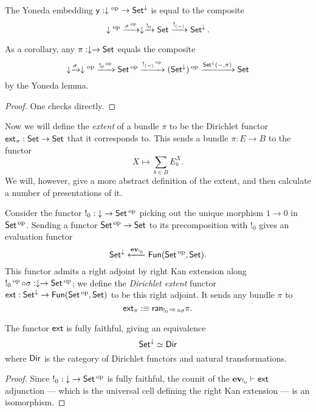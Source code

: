 \begin{lem}
The Yoneda embedding $\yo : \downarrow\op \to \Set^{\downarrow}$ is equal to the
composite $$\downarrow\op \xto{\sigma\op} \downarrow \xto{!_{0}} \Set
\xto{!_{(-)}} \Set^{\downarrow}.$$

As a corollary, any $\pi : \downarrow \to \Set$ equals the composite
$$\downarrow \xto{\sigma} \downarrow\op \xto{!_0\op} \Set\op \xto{!_{(-)}\op}
(\Set^{\downarrow})\op \xto{\Set^{\downarrow}(-, \pi)} \Set$$
by the Yoneda lemma.
\end{lem}
\begin{proof}
One checks directly.
\end{proof}

Now we will define the \emph{extent} of a bundle $\pi$ to be the Dirichlet functor $\ext_\pi: \Set\to\Set$ that it
corresponds to. This sends a bundle
$\pi : E \to B$ to the functor
$$X \mapsto \sum_{b \in B} E_b^X.$$
We will, however, give a more abstract definition of the extent, and then
calculate a number of presentations of it.

\begin{defn}\label{def.extent}
  Consider the functor $!_0 : \down \to \Set\op$ picking out the unique morphism $1\to 0$ in $\Set\op$. Sending a functor $\Set\op\to\Set$ to its precomposition with $!_0$ gives an evaluation functor
  $$\Set^{\down} \xleftarrow{\ev_{!_0}} \Fun(\Set\op, \Set).$$
  This functor admits a right adjoint by right Kan extension along $!_0\op \circ
  \sigma : \downarrow \to \Set\op$; we define the
  \emph{Dirichlet extent} functor $\ext : \Set^{\down} \to \Fun(\Set\op,
  \Set)$ to be this right adjoint. It sends any bundle $\pi$ to
  $$\ext_{\pi} :\equiv \term{ran}_{!_0\op \circ \sigma} \pi.$$
\end{defn}

\begin{prop}
  The functor $\ext$ is fully faithful, giving an equivalence
  $$\Set^{\down} \simeq \Dir$$
  where $\Dir$ is the category of Dirichlet functors and natural transformations.
\end{prop}
\begin{proof}
Since $!_0 : \down \to \Set\op$ is fully faithful, the counit of the
$\ev_{!_0} \vdash \ext$ adjunction --- which is the universal cell defining the
right Kan extension --- is an isomorphism. 
\end{proof}

